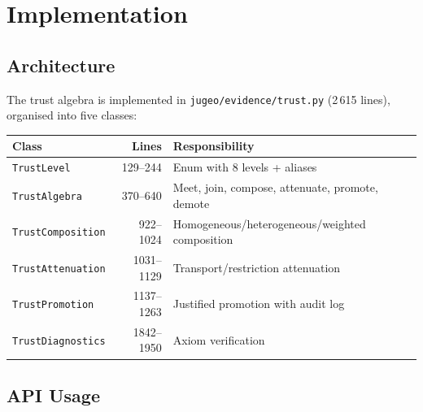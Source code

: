 \documentclass[11pt]{article}
\begin{document}
\section{Implementation}\label{sec:impl}

\subsection{Architecture}

The trust algebra is implemented in \texttt{jugeo/evidence/trust.py} (2\,615
lines), organised into five classes:

\begin{center}
\begin{tabular}{lrl}
\toprule
\textbf{Class} & \textbf{Lines} & \textbf{Responsibility} \\
\midrule
\texttt{TrustLevel}       & 129--244  & Enum with 8 levels + aliases \\
\texttt{TrustAlgebra}      & 370--640  & Meet, join, compose, attenuate, promote, demote \\
\texttt{TrustComposition}  & 922--1024 & Homogeneous/heterogeneous/weighted composition \\
\texttt{TrustAttenuation}  & 1031--1129 & Transport/restriction attenuation \\
\texttt{TrustPromotion}    & 1137--1263 & Justified promotion with audit log \\
\texttt{TrustDiagnostics}  & 1842--1950 & Axiom verification \\
\bottomrule
\end{tabular}
\end{center}

\subsection{API Usage}
\end{document}
